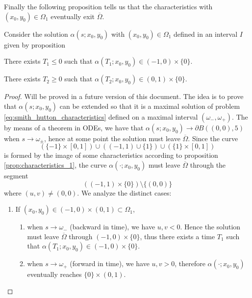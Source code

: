 \noindent
Finally the following proposition tells us that the characteristics with
$(x_0,y_0) \in \Omega_1$ eventually exit $\overline{\Omega}$.
\begin{prop}
	Consider the solution $\alpha(s;x_0,y_0)$ with $(x_0,y_0) \in \Omega_1$
	defined in an interval $I$ given by proposition 
	\begin{enumerateprop}
		\item There exists $T_1 \leq 0$ such that $\alpha(T_1;x_0,y_0) \in (-1,0)
		\times \{ 0 \}$.
		\item There exists $T_2 \geq 0$ such that $\alpha(T_2;x_0,y_0) \in (0,1)
		\times \{ 0 \}$.
	\end{enumerateprop}
\end{prop}
\begin{proof}
	Will be proved in a future version of this document. The idea is to prove
	that $\alpha(s;x_0,y_0)$ can be extended so that it is a maximal solution of
	problem \eqref{eq:smith_hutton_characteristics} defined on a maximal
	interval $(\omega_{-}, \omega_{+})$. The by means of a theorem in ODEs, we
	have that $\alpha(s;x_0,y_0) \to \partial B((0,0),5)$ when $s \to
	\omega_{\pm}$, hence at some point the solution must leave
	$\overline{\Omega}$. Since the curve
	\[
		\left( \{ -1 \} \times [0,1] \right) \cup 
		\left( (-1,1) \cup \{ 1 \} \right) \cup
		\left( \{ 1 \} \times [0,1] \right)
	\]
	is formed by the image of some characteristics according to proposition
	\ref{prop:characteristics_1}, the curve $\alpha(\cdot; x_0, y_0)$ must leave
	$\overline{\Omega}$ through the segment
	\[
		\left( (-1,1) \times \{ 0 \} \right) \setminus \{ (0,0) \}
	\]
	where $(u,v) \neq (0,0)$. We analyze the distinct cases:
	\begin{enumerate}[label={(\arabic*)}, topsep=0pt]
		\item If $(x_0,y_0) \in (-1,0) \times (0,1) \subset \Omega_1$,
		\begin{enumerate}[label={(1.\arabic*)}, topsep=0pt]
			\item when $s \to \omega_{-}$ (backward in time), we have $u, v <
			0$. Hence the solution must leave $\overline{\Omega}$ through
			$(-1,0) \times \{ 0 \}$, thus there exists a time $T_1$ such that
			$\alpha(T_1;x_0,y_0) \in (-1,0) \times \{ 0 \}$. \label{item:11}
			\item when $s \to \omega_{+}$ (forward in time), we have $u, v > 0$,
			therefore $\alpha(\cdot;x_0,y_0)$ eventually reaches $\{ 0 \} \times (0,1)$. \label{item:12}
		\end{enumerate}


\end{enumerate}
\end{proof}
